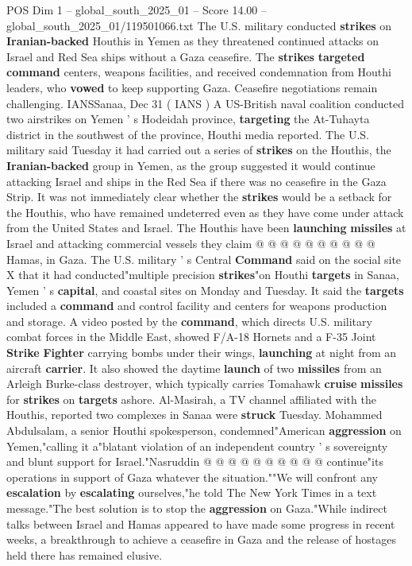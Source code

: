 \begin{textsample}{POS Dim 1 – global\_south\_2025\_01 – Score 14.00 – global\_south\_2025\_01/119501066.txt}  \label{ex:f1_pos_310}
The U.S. military conducted \textbf{strikes} on \textbf{Iranian-backed} Houthis in Yemen as they threatened continued attacks on Israel and Red Sea ships without a Gaza ceasefire.
The \textbf{strikes} \textbf{targeted} \textbf{command} centers, weapons facilities, and received condemnation from Houthi leaders, who \textbf{vowed} to keep supporting Gaza.
Ceasefire negotiations remain challenging.
IANSSanaa, Dec 31 ( IANS ) A US-British naval coalition conducted two airstrikes on Yemen ' s Hodeidah province, \textbf{targeting} the At-Tuhayta district in the southwest of the province, Houthi media reported.
The U.S. military said Tuesday it had carried out a series of \textbf{strikes} on the Houthis, the \textbf{Iranian-backed} group in Yemen, as the group suggested it would continue attacking Israel and ships in the Red Sea if there was no ceasefire in the Gaza Strip.
It was not immediately clear whether the \textbf{strikes} would be a setback for the Houthis, who have remained undeterred even as they have come under attack from the United States and Israel.
The Houthis have been \textbf{launching} \textbf{missiles} at Israel and attacking commercial vessels they claim @ @ @ @ @ @ @ @ @ @ Hamas, in Gaza.
The U.S. military ' s Central \textbf{Command} said on the social site X that it had conducted"multiple precision \textbf{strikes}"on Houthi \textbf{targets} in Sanaa, Yemen ' s \textbf{capital}, and coastal sites on Monday and Tuesday.
It said the \textbf{targets} included a \textbf{command} and control facility and centers for weapons production and storage.
A video posted by the \textbf{command}, which directs U.S. military combat forces in the Middle East, showed F/A-18 Hornets and a F-35 Joint \textbf{Strike} \textbf{Fighter} carrying bombs under their wings, \textbf{launching} at night from an aircraft \textbf{carrier}.
It also showed the daytime \textbf{launch} of two \textbf{missiles} from an Arleigh Burke-class destroyer, which typically carries Tomahawk \textbf{cruise} \textbf{missiles} for \textbf{strikes} on \textbf{targets} ashore.
Al-Masirah, a TV channel affiliated with the Houthis, reported two complexes in Sanaa were \textbf{struck} Tuesday.
Mohammed Abdulsalam, a senior Houthi spokesperson, condemned"American \textbf{aggression} on Yemen,"calling it a"blatant violation of an independent country ' s sovereignty and blunt support for Israel."Nasruddin @ @ @ @ @ @ @ @ @ @ continue"its operations in support of Gaza whatever the situation.""We will confront any \textbf{escalation} by \textbf{escalating} ourselves,"he told The New York Times in a text message."The best solution is to stop the \textbf{aggression} on Gaza."While indirect talks between Israel and Hamas appeared to have made some progress in recent weeks, a breakthrough to achieve a ceasefire in Gaza and the release of hostages held there has remained elusive.

\end{textsample}
